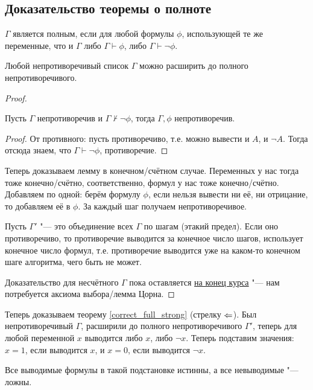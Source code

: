 \subsection{Доказательство теоремы о полноте}
\begin{Def}
	$\Gamma$ является полным, если для любой формулы $\phi$, использующей те же переменные, что и $\Gamma$
	либо $\Gamma \vdash \phi$, либо $\Gamma \vdash \lnot \phi$.
\end{Def}
\begin{lemma}\label{consistent_list_extend_to_full}
	Любой непротиворечивый список $\Gamma$ можно расширить до полного непротиворечивого.
\end{lemma}
\begin{proof}
	\begin{assertion}
		Пусть $\Gamma$ непротиворечив и $\Gamma \nvdash \lnot \phi$, тогда
		$\Gamma, \phi$ непротиворечив.
	\end{assertion}
	\begin{proof}
		От противного: пусть противоречиво, т.е. можно вывести и $A$, и $\lnot A$.
		Тогда отсюда знаем, что $\Gamma \vdash \lnot \phi$, противоречие.
	\end{proof}
	Теперь доказываем лемму в конечном/счётном случае.
	Переменных у нас тогда тоже конечно/счётно, соответственно, формул у нас тоже конечно/счётно.
	Добавляем по одной: берём формулу $\phi$, если нельзя вывести ни её, ни отрицание, то добавляем её в $\phi$.
	За каждый шаг получаем непротиворечивое.

	Пусть $\Gamma'$ "--- это объединение всех $\Gamma$ по шагам (этакий предел).
	Если оно противоречиво, то противоречие выводится за конечное число шагов, использует конечное число формул,
	т.е. противоречие выводится уже на каком-то конечном шаге алгоритма, чего быть не может.

	Доказательство для несчётного $\Gamma$ пока оставляется \hyperref[zorn_lemma_exmp_list_full]{на конец курса} "--- нам потребуется аксиома выбора/лемма Цорна.
\end{proof}
Теперь доказываем теорему \ref{correct_full_strong} (стрелку $\Leftarrow$).
Был непротиворечивый $\Gamma$, расширили до полного непротиворечивого $\Gamma'$, теперь для любой переменной $x$ выводится либо $x$, либо $\lnot x$.
Теперь подставим значения: $x=1$, если выводится $x$, и $x=0$, если выводится $\lnot x$.
\begin{assertion}\label{interpret_eq_derivability_non_pred}
	Все выводимые формулы в такой подстановке истинны, а все невыводимые "--- ложны.
\end{assertion}
